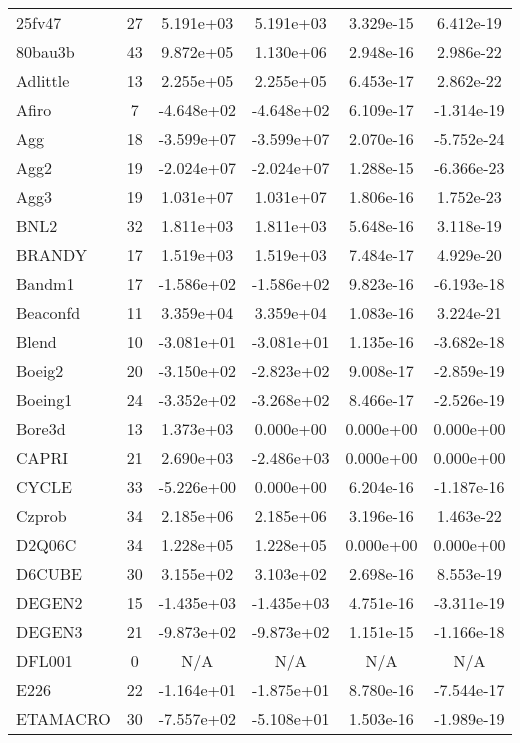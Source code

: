 \documentclass[12pt]{article}
\begin{document}
\begin{longtable}{@{}l|ccccc@{}}
\bottomrule
\endlastfoot
25fv47 & 27 & 5.191e+03 & 5.191e+03 & 3.329e-15 & 6.412e-19 \\
80bau3b & 43 & 9.872e+05 & 1.130e+06 & 2.948e-16 & 2.986e-22 \\
Adlittle & 13 & 2.255e+05 & 2.255e+05 & 6.453e-17 & 2.862e-22 \\
Afiro & 7 & -4.648e+02 & -4.648e+02 & 6.109e-17 & -1.314e-19 \\
Agg & 18 & -3.599e+07 & -3.599e+07 & 2.070e-16 & -5.752e-24 \\
Agg2 & 19 & -2.024e+07 & -2.024e+07 & 1.288e-15 & -6.366e-23 \\
Agg3 & 19 & 1.031e+07 & 1.031e+07 & 1.806e-16 & 1.752e-23 \\
BNL2 & 32 & 1.811e+03 & 1.811e+03 & 5.648e-16 & 3.118e-19 \\
BRANDY & 17 & 1.519e+03 & 1.519e+03 & 7.484e-17 & 4.929e-20 \\
Bandm1 & 17 & -1.586e+02 & -1.586e+02 & 9.823e-16 & -6.193e-18 \\
Beaconfd & 11 & 3.359e+04 & 3.359e+04 & 1.083e-16 & 3.224e-21 \\
Blend & 10 & -3.081e+01 & -3.081e+01 & 1.135e-16 & -3.682e-18 \\
Boeig2 & 20 & -3.150e+02 & -2.823e+02 & 9.008e-17 & -2.859e-19 \\
Boeing1 & 24 & -3.352e+02 & -3.268e+02 & 8.466e-17 & -2.526e-19 \\
Bore3d & 13 & 1.373e+03 & 0.000e+00 & 0.000e+00 & 0.000e+00 \\
CAPRI & 21 & 2.690e+03 & -2.486e+03 & 0.000e+00 & 0.000e+00 \\
CYCLE & 33 & -5.226e+00 & 0.000e+00 & 6.204e-16 & -1.187e-16 \\
Czprob & 34 & 2.185e+06 & 2.185e+06 & 3.196e-16 & 1.463e-22 \\
D2Q06C & 34 & 1.228e+05 & 1.228e+05 & 0.000e+00 & 0.000e+00 \\
D6CUBE & 30 & 3.155e+02 & 3.103e+02 & 2.698e-16 & 8.553e-19 \\
DEGEN2 & 15 & -1.435e+03 & -1.435e+03 & 4.751e-16 & -3.311e-19 \\
DEGEN3 & 21 & -9.873e+02 & -9.873e+02 & 1.151e-15 & -1.166e-18 \\
DFL001 & 0 & N/A & N/A & N/A & N/A \\
E226 & 22 & -1.164e+01 & -1.875e+01 & 8.780e-16 & -7.544e-17 \\
ETAMACRO & 30 & -7.557e+02 & -5.108e+01 & 1.503e-16 & -1.989e-19 \\

\end{longtable}
\end{document}
